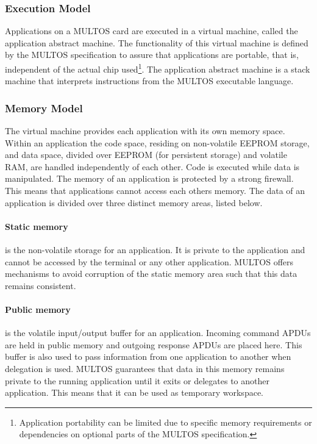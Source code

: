 \subsubsection{Execution Model}

Applications on a MULTOS card are executed in a virtual machine, called the
application abstract machine. The functionality of this virtual machine is
defined by the MULTOS specification to assure that applications are portable,
that is, independent of the actual chip used\footnote{Application portability
can be limited due to specific memory requirements or dependencies on optional
parts of the MULTOS specification.}. The application abstract machine is a stack
machine that interprets instructions from the MULTOS executable language.

\subsubsection{Memory Model}

The virtual machine provides each application with its own memory space. Within
an application the code space, residing on non-volatile EEPROM storage, and data
space, divided over EEPROM (for persistent storage) and volatile RAM, are
handled independently of each other. Code is executed while data is manipulated.
The memory of an application is protected by a strong firewall. This means that
applications cannot access each others memory. The data of an application is
divided over three distinct memory areas, listed below.

\paragraph{Static memory} is the non-volatile storage for an application. It is
private to the application and cannot be accessed by the terminal or any other
application. MULTOS offers mechanisms to avoid corruption of the static memory
area such that this data remains consistent.

\paragraph{Public memory} is the volatile input/output buffer for an
application. Incoming command APDUs are held in public memory and outgoing
response APDUs are placed here. This buffer is also used to pass information
from one application to another when delegation is used. MULTOS guarantees that
data in this memory remains private to the running application until it exits
or delegates to another application. This means that it can be used as
temporary workspace.

